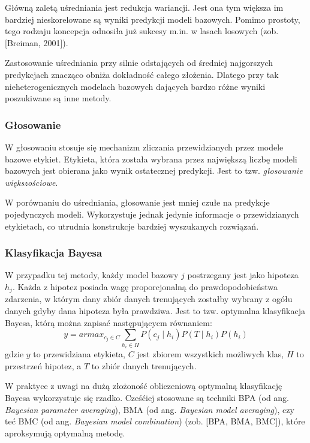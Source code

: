 Główną zaletą uśredniania jest redukcja wariancji. Jest ona tym większa im bardziej nieskorelowane są wyniki predykcji modeli bazowych. Pomimo prostoty, tego rodzaju koncepcja odnosiła już sukcesy m.in. w lasach losowych (zob. [Breiman, 2001]).

Zastosowanie uśredniania przy silnie odstających od średniej najgorszych predykcjach znacząco obniża dokładność całego złożenia. Dlatego przy tak nieheterogenicznych modelach bazowych dających bardzo różne wyniki poszukiwane są inne metody.

\subsubsection{Głosowanie}

W głosowaniu stosuje się mechanizm zliczania przewidzianych przez modele bazowe etykiet. Etykieta, która została wybrana przez największą liczbę modeli bazowych jest obierana jako wynik ostatecznej predykcji. Jest to tzw. \textit{głosowanie większościowe}.

W porównaniu do uśredniania, głosowanie jest mniej czułe na predykcje pojedynczych modeli. Wykorzystuje jednak jedynie informacje o przewidzianych etykietach, co utrudnia konstrukcje bardziej wyszukanych rozwiązań.

\subsubsection{Klasyfikacja Bayesa}

W przypadku tej metody, każdy model bazowy $j$ postrzegany jest jako hipoteza $h_j$. Każda z hipotez posiada wagę proporcjonalną do prawdopodobieństwa zdarzenia, w którym dany zbiór danych trenujących zostałby wybrany z ogółu danych gdyby dana hipoteza była prawdziwa. Jest to tzw. optymalna klasyfikacja Bayesa, którą można zapisać następującycm równaniem:
\begin{equation}
y = armax_{c_j \in C} \sum_{h_i \in H} P(c_j \mid h_i)P(T \mid h_i)P(h_i)
\end{equation}
gdzie $y$ to przewidziana etykieta, $C$ jest zbiorem wszystkich możliwych klas, $H$ to przestrzeń hipotez, a $T$ to zbiór danych trenujących.

W praktyce z uwagi na dużą złożoność obliczeniową optymalną klasyfikację Bayesa wykorzystuje się rzadko. Cześćiej stosowane są techniki BPA (od ang. \textit{Bayesian parameter averaging}), BMA (od ang. \textit{Bayesian model averaging}), czy teć BMC (od ang. \textit{Bayesian model combination}) (zob. [BPA, BMA, BMC]), które aproksymują optymalną metodę.


